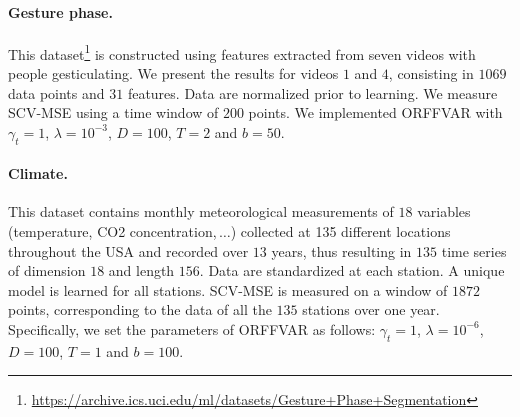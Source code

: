 \paragraph{Gesture phase.} 
This dataset\footnote{%
\url{https://archive.ics.uci.edu/ml/datasets/Gesture+Phase+Segmentation}} is
constructed using features extracted from seven videos with people
gesticulating. We present the results for videos $1$ and $4$, consisting in
$1069$ data points and $31$ features. Data are normalized prior to learning. We
measure \acs{SCV-MSE} using a time window of $200$ points. We implemented
\acs{ORFFVAR} with $\gamma_t = 1$, $\lambda = 10^{-3}$, $D=100$, $T=2$ and
$b=50$.
\paragraph{Climate.} 
This dataset \citep{liu2010learning} contains monthly meteorological
measurements of $18$ variables (temperature, CO2 concentration,\,$\dots$)
collected at 135 different locations throughout the USA and recorded over $13$
years, thus resulting in $135$ time series of dimension $18$ and length $156$.
Data are standardized at each station. A unique model is learned for all
stations.  \acs{SCV-MSE} is measured on a window of $1872$ points,
corresponding to the data of all the $135$ stations over one year.
Specifically, we set the parameters of \acs{ORFFVAR} as follows: $\gamma_t =
1$, $\lambda = 10^{-6}$, $D=100$, $T=1$ and $b=100$.
